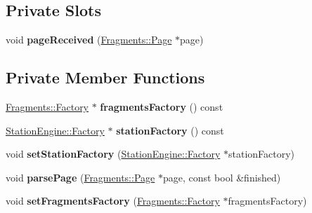 \subsection*{Private Slots}
\begin{DoxyCompactItemize}
\item 
\mbox{\label{classLiveboardEngine_1_1Factory_a0201463446beff21ab5fceb64f56ad50}} 
void {\bfseries page\+Received} (\mbox{\hyperlink{classFragments_1_1Page}{Fragments\+::\+Page}} $\ast$page)
\end{DoxyCompactItemize}
\subsection*{Private Member Functions}
\begin{DoxyCompactItemize}
\item 
\mbox{\label{classLiveboardEngine_1_1Factory_ab90c1ee0ead367bbd75ed69823fe486f}} 
\mbox{\hyperlink{classFragments_1_1Factory}{Fragments\+::\+Factory}} $\ast$ {\bfseries fragments\+Factory} () const
\item 
\mbox{\label{classLiveboardEngine_1_1Factory_a7bfcb03543a49a277347512d81c6db34}} 
\mbox{\hyperlink{classStationEngine_1_1Factory}{Station\+Engine\+::\+Factory}} $\ast$ {\bfseries station\+Factory} () const
\item 
\mbox{\label{classLiveboardEngine_1_1Factory_ac4e57f9038fdeb983321fd68dc833e6a}} 
void {\bfseries set\+Station\+Factory} (\mbox{\hyperlink{classStationEngine_1_1Factory}{Station\+Engine\+::\+Factory}} $\ast$station\+Factory)
\item 
\mbox{\label{classLiveboardEngine_1_1Factory_aa806f015edf7a559e3e536d408706006}} 
void {\bfseries parse\+Page} (\mbox{\hyperlink{classFragments_1_1Page}{Fragments\+::\+Page}} $\ast$page, const bool \&finished)
\item 
\mbox{\label{classLiveboardEngine_1_1Factory_a279c353aaa01c123521e732b83ffa33d}} 
void {\bfseries set\+Fragments\+Factory} (\mbox{\hyperlink{classFragments_1_1Factory}{Fragments\+::\+Factory}} $\ast$fragments\+Factory)
\item 

\end{DoxyCompactItemize}
